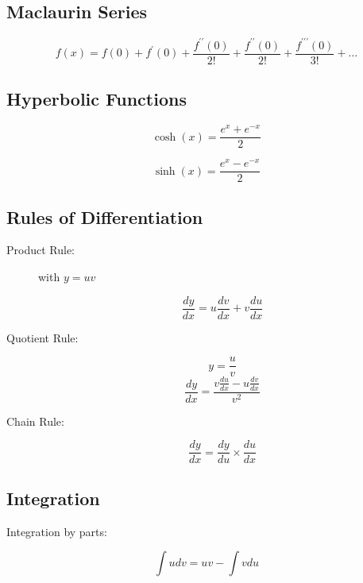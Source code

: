 \documentclass[a4paper,12pt]{article}
\begin{document}
			\subsection*{Maclaurin Series}
			\[f(x) = f(0) + f^{\prime}(0) + \frac{f^{\prime \prime}(0)}{2!} + \frac{f^{\prime \prime}(0)}{2!} + \frac{f^{\prime\prime \prime}(0)}{3!} + \ldots \]
	
	\subsection*{Hyperbolic Functions }
	
	\[ \cosh(x)  =  \frac{e^{x} + e^{-x}}{2} \]
	
	\[ \sinh(x)  = \frac{e^{x} - e^{-x}}{2} \]
	
	
	\subsection*{Rules of Differentiation}
\begin{description}
\item[Product Rule:]  with $y = uv$
	
	
	\[ \frac{dy}{dx} = u \frac{dv}{dx} +  v \frac{du}{dx} \]
	
\item[Quotient Rule:] \[ y = \frac{u}{v}\]
	\[ \frac{dy}{dx}  = \frac{v \frac{du}{dx} - u \frac{dv}{dx} }{v^2} \]
	
	
	
\item[Chain Rule:]
	
	\[ \frac{dy}{dx} = \frac{dy}{du} \times \frac{du}{dx}  \]
\end{description}
	
	\subsection*{Integration}
	
	Integration by parts: 
	
	\[ \int u dv = uv - \int v du \]  
	
\end{document}
